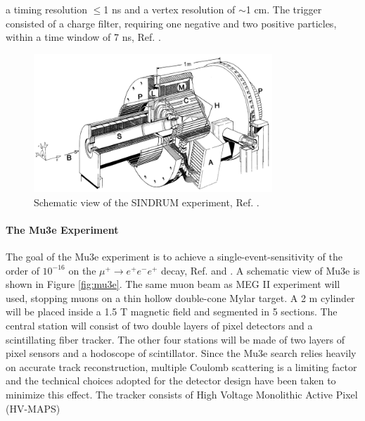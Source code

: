 a timing
resolution $\leq$1 ns and a vertex resolution of $\sim$1 cm. The trigger consisted of a charge filter, requiring one negative and two positive particles, within a time window of 7 ns, Ref. \cite{universe8060299}.
\begin{figure}[!h]
\centering
\includegraphics[width =0.8\textwidth]{figures/png/The-SINDRUM-I-detector-in-the-horizontal-operating-orientation.png}
\caption[SINDRUM experiment.]{Schematic view of the SINDRUM experiment, Ref. \cite{sindrumi}.}
\label{fig:sindrumi}
\end{figure}

\paragraph{The Mu3e Experiment}
The goal of the Mu3e experiment is to achieve a single-event-sensitivity of the order
of $10^{-16}$ on the $\mu^+ \rightarrow e^+ e^-  e^+ $ decay, Ref. \cite{hesketh2022mu3e} and \cite{papa}. 
A schematic view of Mu3e is shown in Figure \ref{fig:mu3e}.
The same muon beam as MEG II experiment will  used, stopping muons on a thin hollow double-cone Mylar target. 
A 2 m cylinder will be placed inside a 1.5 T magnetic field and segmented in 5 sections. 
The central station will consist of two double layers of pixel detectors and a
scintillating fiber tracker. The other four stations will be made of two layers of pixel
sensors and a hodoscope of scintillator. Since the Mu3e search relies heavily on accurate track reconstruction, multiple Coulomb
scattering is a limiting factor and the technical choices adopted for the detector design
have been taken to minimize this effect. The tracker consists of {\violet High Voltage Monolithic Active Pixel} (HV-MAPS)


